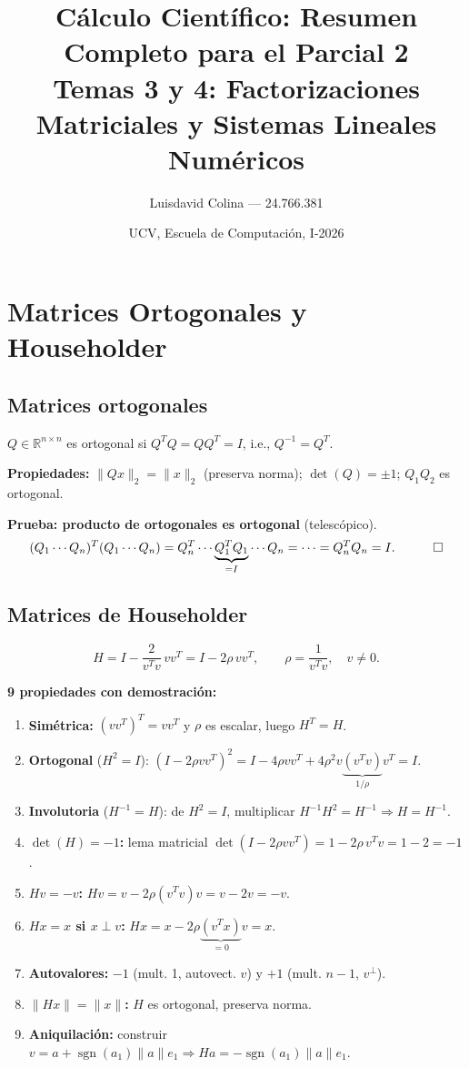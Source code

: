 \documentclass[12pt,a4paper]{article}
\title{\textbf{Cálculo Científico: Resumen Completo para el Parcial 2}\\
\large Temas 3 y 4: Factorizaciones Matriciales y Sistemas Lineales Numéricos}
\author{Luisdavid Colina — 24.766.381}
\date{UCV, Escuela de Computación, I-2026}
\begin{document}
\label{pgindice}
\maketitle
\newpage

\section{Matrices Ortogonales y Householder}

\subsection{Matrices ortogonales}

$Q\in\mathbb{R}^{n\times n}$ es ortogonal si $Q^TQ=QQ^T=I$, i.e., $Q^{-1}=Q^T$.

\textbf{Propiedades:} $\|Qx\|_2=\|x\|_2$ (preserva norma); $\det(Q)=\pm1$; $Q_1Q_2$ es ortogonal.

\begin{resultado}
\textbf{Prueba: producto de ortogonales es ortogonal} (telescópico).
\[
  (Q_1\cdots Q_n)^T(Q_1\cdots Q_n)=Q_n^T\cdots\underbrace{Q_1^TQ_1}_{=I}\cdots Q_n=\cdots=Q_n^TQ_n=I.\quad\qed
\]
\end{resultado}

\subsection{Matrices de Householder}

\[
  H = I - \frac{2}{v^Tv}\,vv^T = I-2\rho\,vv^T,\qquad \rho=\frac{1}{v^Tv},\quad v\ne0.
\]

\begin{resultado}
\textbf{9 propiedades con demostración:}
\begin{enumerate}[noitemsep, label=P\arabic*.]
  \item \textbf{Simétrica:} $(vv^T)^T=vv^T$ y $\rho$ es escalar, luego $H^T=H$.
  \item \textbf{Ortogonal} ($H^2=I$): $(I-2\rho vv^T)^2=I-4\rho vv^T+4\rho^2v\underbrace{(v^Tv)}_{1/\rho}v^T=I$.
  \item \textbf{Involutoria} ($H^{-1}=H$): de $H^2=I$, multiplicar $H^{-1}H^2=H^{-1} \Rightarrow H=H^{-1}$.
  \item \textbf{$\det(H)=-1$:} lema matricial $\det(I-2\rho vv^T)=1-2\rho\,v^Tv=1-2=-1$.
  \item \textbf{$Hv=-v$:} $Hv=v-2\rho(v^Tv)v=v-2v=-v$.
  \item \textbf{$Hx=x$ si $x\perp v$:} $Hx=x-2\rho\underbrace{(v^Tx)}_{=0}v=x$.
  \item \textbf{Autovalores:} $-1$ (mult. 1, autovect. $v$) y $+1$ (mult. $n-1$, $v^\perp$).
  \item \textbf{$\|Hx\|=\|x\|$:} $H$ es ortogonal, preserva norma.
  \item \textbf{Aniquilación:} construir $v=a+\operatorname{sgn}(a_1)\|a\|e_1 \Rightarrow Ha=-\operatorname{sgn}(a_1)\|a\|e_1$.
\end{enumerate}
\end{resultado}
\end{document}
